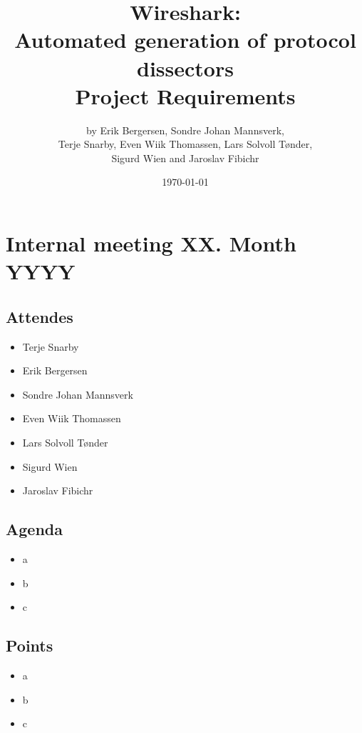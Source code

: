 \documentclass[a4paper, 11pt]{report}
\title{Wireshark:\\ Automated generation of protocol dissectors\\
		Project Requirements}
\author{by Erik Bergersen, Sondre Johan Mannsverk,\\ Terje Snarby,
		Even Wiik Thomassen, Lars Solvoll Tønder,\\ Sigurd Wien
		and Jaroslav Fibichr}
\date{\today}
\begin{document}
\section*{Internal meeting XX. Month YYYY}

\subsection*{Attendes}

\begin{itemize}
\item Terje Snarby
\item Erik Bergersen
\item Sondre Johan Mannsverk
\item Even Wiik Thomassen
\item Lars Solvoll Tønder
\item Sigurd Wien
\item Jaroslav Fibichr
\end{itemize}

\subsection*{Agenda}

\begin{itemize}
\item a
\item b
\item c
\end{itemize}

\subsection*{Points}

\begin{itemize}
\item a
\item b
\item c
\end{itemize}
\end{document}

